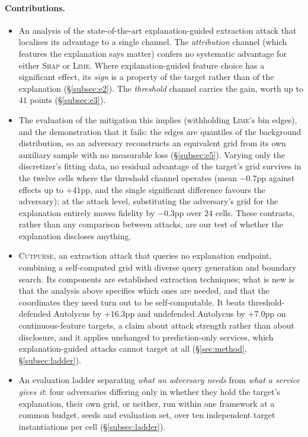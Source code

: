 \documentclass[sigconf,anonymous,review]{acmart}
\newcommand{\sys}{\textsc{Cutpurse}}
\begin{document}
\paragraph{Contributions.}
\begin{itemize}
  \item An analysis of the state-of-the-art explanation-guided extraction attack that localises its
  advantage to a single channel. The \emph{attribution} channel (which features the explanation says matter) confers no systematic advantage for either \textsc{Shap} or \textsc{Lime}. Where explanation-guided feature choice has a significant effect, its \emph{sign} is a property of the
  target rather than of the explanation (\S\ref{subsec:e2}). The \emph{threshold} channel carries the
  gain, worth up to $41$ points (\S\ref{subsec:e3}).
  \item The evaluation of the mitigation this implies (withholding \textsc{Lime}'s bin edges), and the demonstration that it fails: the edges are quantiles of the background distribution, so an
  adversary reconstructs an equivalent grid from its own auxiliary sample with no measurable loss
  (\S\ref{subsec:e5}). Varying only the discretizer's fitting data, no residual advantage of the
  target's grid survives in the twelve cells where the threshold channel operates (mean $-0.7$pp
  against effects up to $+41$pp, and the single significant difference favours the adversary); at the
  attack level, substituting the adversary's grid for
  the explanation entirely moves fidelity by $-0.3$pp over $24$ cells. These contrasts, rather than
  any comparison between attacks, are our test of whether the explanation discloses anything.
  \item \sys, an extraction attack that queries no explanation endpoint, combining a self-computed
  grid with diverse query generation and boundary search. Its components are established extraction
  techniques; what is new is that the analysis above specifies which ones are needed, and that the
  coordinates they need turn out to be self-computable. It beats threshold-defended Autolycus by
  $+16.3$pp and undefended Autolycus by $+7.0$pp on continuous-feature targets, a claim about attack
  strength rather than about disclosure, and it applies unchanged to prediction-only services, which
  explanation-guided attacks cannot target at all (\S\ref{sec:method}, \S\ref{subsec:ladder}).
  \item An evaluation ladder separating \emph{what an adversary needs} from \emph{what a service gives
  it}: four adversaries differing only in whether they hold the target's explanation, their own grid,
  or neither, run within one framework at a common budget, seeds and evaluation set, over ten
  independent target instantiations per cell (\S\ref{subsec:ladder}).
\end{itemize}
\end{document}

